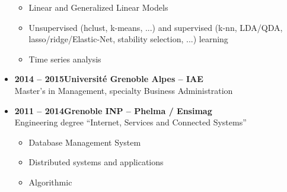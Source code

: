 \documentclass{article}
\begin{document}
\begin{minipage}{0.8\textwidth}
\begin{flushleft}
\begin{itemize}
\begin{itemize}[leftmargin=*]
            \item Linear and Generalized Linear Models
            \item Unsupervised (hclust, k-means, ...) and supervised (k-nn, LDA/QDA, lasso/ridge/Elastic-Net, stability selection, ...) learning
            \item Time series analysis
        \end{itemize}
        \item \textbf{2014 – 2015\qquad \qquad \qquad \qquad Université Grenoble Alpes – IAE} \\
        Master’s in Management, specialty Business Administration
        \item \textbf{2011 – 2014\qquad \qquad \qquad \qquad Grenoble INP – Phelma / Ensimag} \\
        Engineering degree “Internet, Services and Connected Systems”
        \vspace{-.15cm}
        \begin{itemize}[leftmargin=*]
        \setlength\itemsep{.01cm}
            \item Database Management System
            \item Distributed systems and applications
            \item Algorithmic
        \end{itemize}
    \end{itemize}

\end{flushleft}
\end{minipage}
\end{document}
